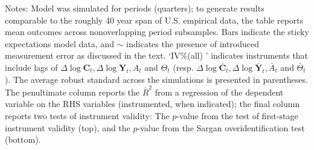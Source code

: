 Notes: Model was simulated for 
periods (quarters); to generate results comparable to the roughly
40 year span of U.S. empirical data, the table reports mean outcomes across 
nonoverlapping 
period subsamples.  Bars indicate the sticky
expectations model data, and $\sim$ indicates the presence of
introduced measurement error as discussed in the text.
`IV\%(all)
' indicates instruments that include lags of $\Delta
\log \mathbf{C}_{t},\Delta
\log \mathbf{Y}_{t}, A_{t}$ and $\Theta_{t}$ (resp. $\Delta \log
\bar{\mathbf{C}}_{t}, \Delta \log
\bar{\mathbf{Y}}_{t}, \bar{A}_{t}$ and $\bar{\Theta}_{t}$).  %
The average robust standard across the simulations is presented in 
parentheses.  The penultimate column reports
the $\bar{R}^{2}$ from a regression of the dependent variable on the
RHS variables (instrumented, when indicated); the final column reports
two tests of instrument validity: The $p$-value from the
\cite{shea:iv} test of first-stage instrument validity (top), and the
$p$-value from the Sargan overidentification test (bottom).

